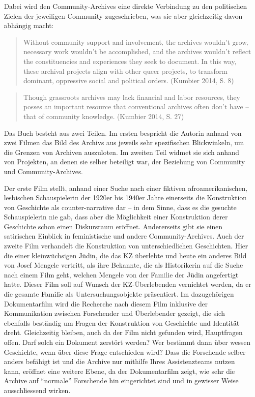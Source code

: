 \documentclass[a4paper,
fontsize=11pt,
oneside,
numbers=noperiodatend,
parskip=half-,
bibliography=totoc,
final
]{scrartcl}
\begin{document}
Dabei wird den Community-Archives eine direkte Verbindung zu den
politischen Zielen der jeweiligen Community zugeschrieben, was sie aber
gleichzeitig davon abhängig macht:

\begin{quote}
Without community support and involvement, the archives wouldn't grow,
necessary work wouldn't be accomplished, and the archives wouldn't
reflect the constituencies and experiences they seek to document. In
this way, these archival projects align with other queer projects, to
transform dominant, oppressive social and political orders. (Kumbier
2014, S. 8)
\end{quote}

\begin{quote}
Though grassroots archives may lack financial and labor resources, they
posses an important resource that conventional archives often don't have
-- that of community knowledge. (Kumbier 2014, S. 27)
\end{quote}

Das Buch besteht aus zwei Teilen. Im ersten bespricht die Autorin anhand
von zwei Filmen das Bild des Archivs aus jeweils sehr spezifischen
Blickwinkeln, um die Grenzen von Archiven auszuloten. Im zweiten Teil
widmet sie sich anhand von Projekten, an denen sie selber beteiligt war,
der Beziehung von Community und Community-Archives.

Der erste Film stellt, anhand einer Suche nach einer fiktiven
afroamerikanischen, lesbischen Schauspielerin der 1920er bis 1940er
Jahre einerseits die Konstruktion von Geschichte als counter-narrative
dar -- in dem Sinne, dass es die gesuchte Schauspielerin nie gab, dass
aber die Möglichkeit einer Konstruktion derer Geschichte schon einen
Diskursraum eröffnet. Andererseits gibt sie einen satirischen Einblick
in feministische und andere Community-Archives. Auch der zweite Film
verhandelt die Konstruktion von unterschiedlichen Geschichten. Hier die
einer kleinwüchsigen Jüdin, die das KZ überlebte und heute ein anderes
Bild von Josef Mengele vertritt, als ihre Bekannte, die als Historikerin
auf die Suche nach einem Film geht, welchen Mengele von der Familie der
Jüdin angefertigt hatte. Dieser Film soll auf Wunsch der KZ-Überlebenden
vernichtet werden, da er die gesamte Familie als Untersuchungsobjekte
präsentiert. Im dazugehörigen Dokumentarfilm wird die Recherche nach
diesem Film inklusive der Kommunikation zwischen Forschender und
Überlebender gezeigt, die sich ebenfalls beständig um Fragen der
Konstruktion von Geschichte und Identität dreht. Gleichzeitig bleiben,
auch da der Film nicht gefunden wird, Hauptfragen offen. Darf solch ein
Dokument zerstört werden? Wer bestimmt dann über wessen Geschichte, wenn
über diese Frage entschieden wird? Dass die Forschende selber anders
befähigt ist und die Archive nur mithilfe Ihres Assistenzteams nutzen
kann, eröffnet eine weitere Ebene, da der Dokumentarfilm zeigt, wie sehr
die Archive auf \enquote{normale} Forschende hin eingerichtet sind und
in gewisser Weise ausschliessend wirken.
\end{document}
